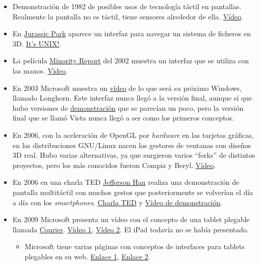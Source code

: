 \begin{itemize}

    \item Demonstración de 1982 de posibles usos de tecnología táctil en pantallas. Realmente la pantalla no es táctil, tiene sensores alrededor de ella. \href{https://www.youtube.com/watch?v=JAcZpQCLb4E}{Vídeo}.

    \item En \href{https://www.imdb.com/title/tt0107290/}{Jurassic Park} aparece un interfaz para navegar un sistema de ficheros en 3D. \href{https://www.youtube.com/watch?v=JOeY07qKU9c}{It's UNIX!}.

    \item La película \href{https://www.imdb.com/title/tt0181689/}{Minority Report} del 2002 muestra un interfaz que se utiliza con las manos. \href{https://www.youtube.com/watch?v=33Raqx9sFbo}{Vídeo}.

    \item En 2003 Microsoft muestra un \href{https://www.youtube.com/watch?v=b9ifQvQCO7Y}{vídeo} de lo que será su próximo Windows, llamado Longhorn. Este interfaz nunca llegó a la versión final, aunque sí que hubo versiones de \href{https://www.youtube.com/watch?v=pjExyeyLBG0}{demonstración} que se parecían un poco, pero la versión final que se llamó Vista nunca llegó a ser como los primeros conceptos.

    \item En 2006, con la aceleración de OpenGL por \textit{hardware} en las tarjetas gráficas, en las distribuciones GNU/Linux nacen los gestores de ventanas con diseños 3D real. Hubo varias alternativas, ya que surgieron varios “forks” de distintos proyectos, pero los más conocidos fueron Compiz y Beryl. \href{https://www.youtube.com/watch?v=4QokOwvPxrE}{Vídeo}.

    \item En 2006 en una charla TED \href{https://en.wikipedia.org/wiki/Jefferson_Han}{Jefferson Han} realiza una demonstración de pantalla multitáctil con muchos gestos que posteriormente se volverían el día a día con los \textit{smartphones}. \href{https://www.youtube.com/watch?v=QKh1Rv0PlOQ}{Charla TED} y \href{https://www.youtube.com/watch?v=wHfKrk8QMM0}{Vídeo de demonstración}.

    \item En 2009 Microsoft presenta un vídeo con el concepto de una tablet plegable llamada \href{https://en.wikipedia.org/wiki/Microsoft_Courier}{Courier}. \href{https://www.youtube.com/watch?v=_hzcs43CD_Y}{Vídeo 1}, \href{https://www.youtube.com/watch?v=pFQWc79TYcU}{Vídeo 2}. El iPad todavía no se había presentado.
    \begin{itemize}
        \item Microsoft tiene varias páginas con conceptos de interfaces para tablets plegables en su web. \href{https://learn.microsoft.com/en-us/dual-screen/android/test-kit/foldable-concepts}{Enlace 1}, \href{https://devblogs.microsoft.com/surface-duo/design-foldable-large-screens/}{Enlace 2}.
    \end{itemize}


\end{itemize}
